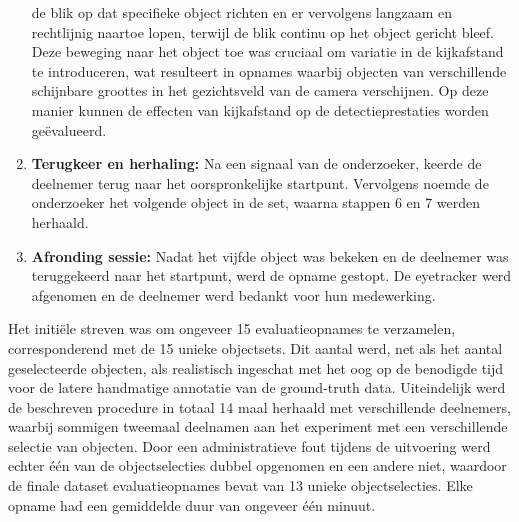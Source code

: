 \begin{enumerate}
  de blik op dat specifieke object richten en er vervolgens langzaam en rechtlijnig naartoe lopen, 
  terwijl de blik continu op het object gericht bleef. 
  Deze beweging naar het object toe was cruciaal om variatie in de kijkafstand te introduceren, 
  wat resulteert in opnames waarbij objecten van verschillende schijnbare groottes in het gezichtsveld van de camera verschijnen. 
  Op deze manier kunnen de effecten van kijkafstand op de detectieprestaties worden geëvalueerd.
  \item \textbf{Terugkeer en herhaling:} Na een signaal van de onderzoeker, keerde de deelnemer terug naar het oorspronkelijke startpunt. 
  Vervolgens noemde de onderzoeker het volgende object in de set, waarna stappen 6 en 7 werden herhaald.
  \item \textbf{Afronding sessie:} Nadat het vijfde object was bekeken en de deelnemer was teruggekeerd naar het startpunt, 
  werd de opname gestopt. De eyetracker werd afgenomen en de deelnemer werd bedankt voor hun medewerking.
\end{enumerate}

Het initiële streven was om ongeveer 15 evaluatieopnames te verzamelen, corresponderend met de 15 unieke objectsets. 
Dit aantal werd, net als het aantal geselecteerde objecten, als realistisch ingeschat met het oog op de benodigde tijd voor de 
latere handmatige annotatie van de ground-truth data. 
Uiteindelijk werd de beschreven procedure in totaal 14 maal herhaald met verschillende deelnemers, 
waarbij sommigen tweemaal deelnamen aan het experiment met een verschillende selectie van objecten. 
Door een administratieve fout tijdens de uitvoering werd echter één van de objectselecties dubbel opgenomen en een andere niet, 
waardoor de finale dataset evaluatieopnames bevat van 13 unieke objectselecties. 
Elke opname had een gemiddelde duur van ongeveer één minuut.

